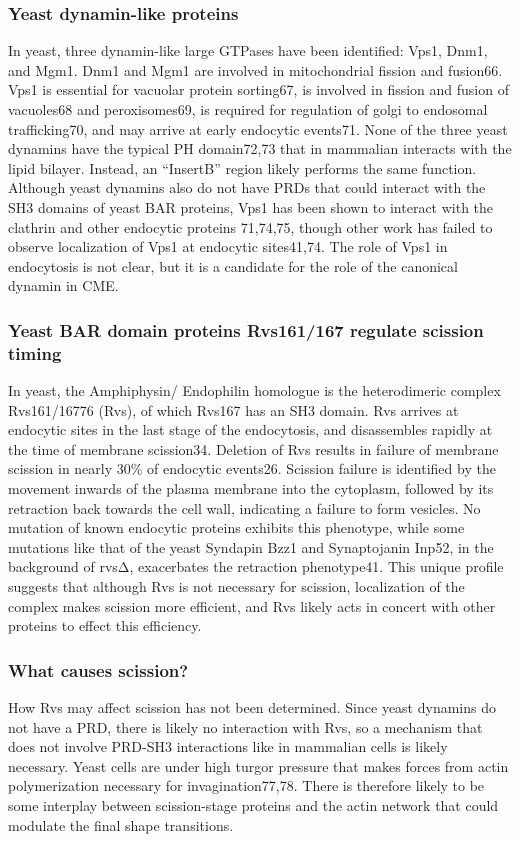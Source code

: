 		\subsubsection{Yeast dynamin-like proteins}
		In yeast, three dynamin-like large GTPases have been identified: Vps1, Dnm1, and Mgm1. Dnm1 and Mgm1 are involved in mitochondrial fission and fusion66. Vps1 is essential for vacuolar protein sorting67, is involved in fission and fusion of vacuoles68 and peroxisomes69, is required for regulation of golgi to endosomal trafficking70, and may arrive at early endocytic events71. None of the three yeast dynamins have the typical PH domain72,73 that in mammalian interacts with the lipid bilayer. Instead, an “InsertB” region likely performs the same function. Although yeast dynamins also do not have PRDs that could interact with the SH3 domains of yeast BAR proteins, Vps1 has been shown to interact with the clathrin and other endocytic proteins 71,74,75, though other work has failed to observe localization of Vps1 at endocytic sites41,74. The role of Vps1 in endocytosis is not clear, but it is a candidate for the role of the canonical dynamin in CME.


		\subsubsection{Yeast BAR domain proteins Rvs161/167 regulate scission timing}
		In yeast, the Amphiphysin/ Endophilin homologue is the heterodimeric complex Rvs161/16776 (Rvs), of which Rvs167 has an SH3 domain. Rvs arrives at endocytic sites in the last stage of the endocytosis, and disassembles rapidly at the time of membrane scission34. Deletion of Rvs results in failure of membrane scission in nearly 30\% of endocytic events26. Scission failure is identified by the movement inwards of the plasma membrane into the cytoplasm, followed by its retraction back towards the cell wall, indicating a failure to form vesicles. No mutation of known endocytic proteins exhibits this phenotype, while some mutations like that of the yeast Syndapin Bzz1 and Synaptojanin Inp52, in the background of rvsΔ, exacerbates the retraction phenotype41. This unique profile suggests that although Rvs is not necessary for scission, localization of the complex makes scission more efficient, and Rvs likely acts in concert with other proteins to effect this efficiency. 

		\subsubsection{What causes scission?}
		How Rvs may affect scission has not been determined. Since yeast dynamins do not have a PRD, there is likely no interaction with Rvs, so a mechanism that does not involve PRD-SH3 interactions like in mammalian cells is likely necessary. Yeast cells are under high turgor pressure that makes forces from actin polymerization necessary for invagination77,78. There is therefore likely to be some interplay between scission-stage proteins and the actin network that could modulate the final shape transitions. 

